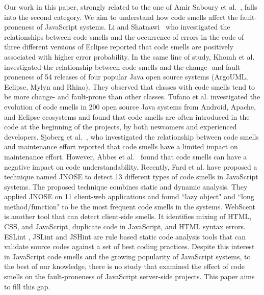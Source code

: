 Our work in this paper, {\color{blue}strongly related to the one of Amir Saboury et al.~\cite{saboury2017empirical}}, falls into the second category. We aim to understand how code smells affect the fault-proneness of JavaScript systems. Li and Shatnawi~\cite{shatnawi2006investigation} who investigated the relationships between code smells and the occurrence of errors in the code of three different versions of Eclipse reported that code smells are positively associated with higher error probability. In the same line of study, Khomh et al.~\cite{khomh2012exploratory} investigated the relationship between code smells and the change- and fault-proneness of 54 releases of four popular Java open source systems (ArgoUML, Eclipse, Mylyn and Rhino). They observed that classes with code smells tend to be more change- and fault-prone than other classes. Tufano et al. \cite{tufano2015and} investigated the evolution of code smells in 200 open source Java systems from Android, Apache, and Eclipse ecosystems and found that code smells are often introduced in the code at the beginning of the projects, by both newcomers and experienced developers. Sjoberg et al.~\cite{Sjoberg13QEC}, who investigated the relationship between code smells and maintenance effort reported that code smells have a limited impact on maintenance effort. However, Abbes et al.~\cite{Abbes11} found that code smells can have a negative impact on code understandability. Recently, Fard et al. \cite{fard2013jsnose} have proposed a technique named JNOSE to detect 13 different types of code smells in JavaScript systems. The proposed technique combines static and dynamic analysis. They applied JNOSE on 11 client-web applications and found ``lazy object" and ``long method/function" to be the most frequent code smells in the systems. WebScent~\cite{nguyen2012detection} is another tool that can detect client-side smells. It identifies mixing of HTML, CSS, and JavaScript, duplicate code in JavaScript, and HTML syntax errors. ESLint \cite{ESLint}, JSLint \cite{JslinT} and JSHint \cite{JSHint} are rule based static code analysis tools that can validate source codes against a set of best coding practices. Despite this interest in JavaScript code smells and the growing popularity of JavaScript systems, to the best of our knowledge, there is no study that examined the effect of code smells on the fault-proneness of JavaScript server-side projects. This paper aims to fill this gap. 


